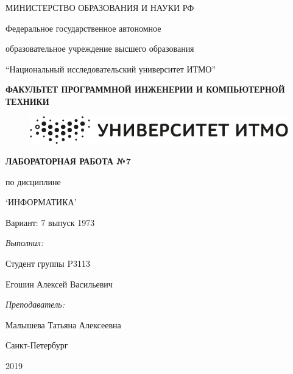 \begin{center}
	\vspace*{1cm}

	МИНИСТЕРСТВО ОБРАЗОВАНИЯ И НАУКИ РФ

	Федеральное государственное автономное

	образовательное учреждение высшего образования

	``Национальный исследовательский университет ИТМО''
	
	\vspace{0.5cm}

	\textbf{ФАКУЛЬТЕТ ПРОГРАММНОЙ ИНЖЕНЕРИИ И КОМПЬЮТЕРНОЙ ТЕХНИКИ}

	\vspace{2cm}

	\begin{figure}[h]
		\centering
		\includegraphics[scale=0.5]{pages/images/itmo.png}
	\end{figure}

	\vspace{2cm}

	\large{\textbf{ЛАБОРАТОРНАЯ РАБОТА №7}}

	по дисциплине

	\large{`ИНФОРМАТИКА'}

	\vspace{0.5cm}

	Вариант: 7 выпуск 1973
\end{center}
	

\vspace{4cm}
	 

\begin{flushright}
	\textit{Выполнил:}
	
	Студент группы P3113
	
	Егошин Алексей Васильевич
	
	\vspace{1cm}
	
	\textit{Преподаватель:}
	
	Малышева Татьяна Алексеевна
\end{flushright}
	 

\vspace{3cm}
	

\begin{center} 
	Санкт-Петербург

	2019 
\end{center}